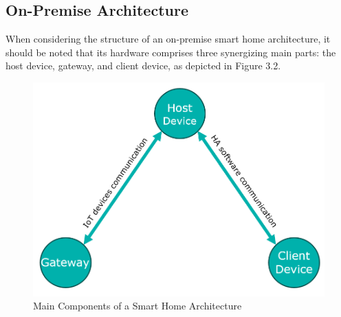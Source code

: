 \subsection{On-Premise Architecture}
When considering the structure of an on-premise smart home architecture, it should be noted that its hardware comprises three synergizing main parts: the host device, gateway, and client device, as depicted in Figure 3.2.\\
\begin{figure}[H]
	\centering
	\includegraphics[width=0.6 \linewidth]{Images/smarthomearch.png}
	\caption{Main Components of a Smart Home Architecture}
	\label{fig:SHome_Comp}
\end{figure}

